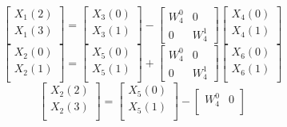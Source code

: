 \documentclass[journal,12pt,twocolumn]{IEEEtran}
\renewcommand\thesection{\arabic{section}}
\begin{document}
\begin{enumerate}[label=\arabic*.,ref=\thesection.\theenumi]
	\begin{equation}
		\begin{bmatrix}
			X_{1}(2) \\ 
			X_{1}(3)\\ 
		\end{bmatrix}
		=
		\begin{bmatrix}
			X_{3}(0) \\ 
			X_{3}(1)\\ 
		\end{bmatrix}
		-
		\begin{bmatrix}
			W^{0}_{4} & 0\\
			0 & W^{1}_{4}
		\end{bmatrix}
		\begin{bmatrix}
			X_{4}(0) \\ 
			X_{4}(1) \\ 
		\end{bmatrix}
	\end{equation}
	\begin{equation}
		\begin{bmatrix}
			X_{2}(0) \\ 
			X_{2}(1)\\ 
		\end{bmatrix}
		=
		\begin{bmatrix}
			X_{5}(0) \\ 
			X_{5}(1)\\ 
		\end{bmatrix}
		+
		\begin{bmatrix}
			W^{0}_{4} & 0\\
			0 & W^{1}_{4}
		\end{bmatrix}
		\begin{bmatrix}
			X_{6}(0) \\ 
			X_{6}(1) \\ 
		\end{bmatrix}
	\end{equation}
	\begin{equation}
		\begin{bmatrix}
			X_{2}(2) \\ 
			X_{2}(3)\\ 
		\end{bmatrix}
		=
		\begin{bmatrix}
			X_{5}(0) \\ 
			X_{5}(1)\\ 
		\end{bmatrix}
		-
		\begin{bmatrix}
			W^{0}_{4} & 0\\

\end{bmatrix}
\end{equation}
\end{enumerate}
\end{document}

